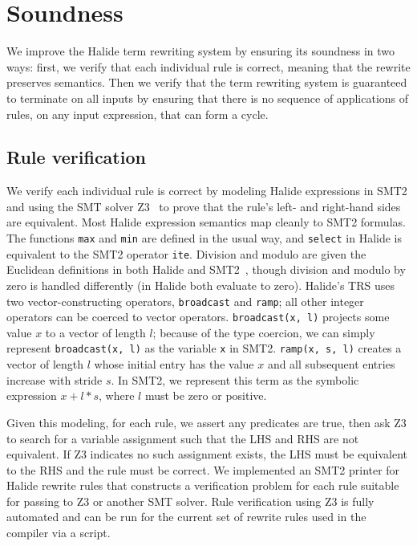 \documentclass[acmsmall,review]{acmart}\settopmatter{printfolios=true,printccs=false,printacmref=false}
\begin{document}
\section{Soundness}
\label{sec:soundness}

We improve the Halide term rewriting system by ensuring its soundness in
two ways: first, we verify that each individual rule is correct, meaning that the
rewrite preserves semantics. Then we verify that the term rewriting system is
guaranteed to terminate on all inputs by ensuring that there is no sequence of
applications of rules, on any input expression, that can form a cycle.

\subsection{Rule verification}

We verify each individual rule is correct by modeling Halide
expressions in SMT2 and using the SMT solver Z3~\cite{de2008z3} to
prove that the rule's left- and right-hand sides are equivalent. Most Halide expression
semantics map cleanly to SMT2 formulas. The functions \texttt{max} and
\texttt{min} are defined in the usual way, and \texttt{select} in
Halide is equivalent to the SMT2 operator \texttt{ite}. Division and
modulo are given the Euclidean definitions in both Halide and
SMT2~\cite{boute1992euclidean}, though division and modulo by zero is handled
differently (in Halide both evaluate to zero).
Halide's TRS uses two vector-constructing operators, \texttt{broadcast} and \texttt{ramp}; all
other integer operators can be coerced to vector operators. 
\texttt{broadcast(x, l)} projects some value $x$ to a vector of length $l$; because of
the type coercion, we can simply represent \texttt{broadcast(x, l)} as the variable
\texttt{x} in SMT2. \texttt{ramp(x, s, l)} creates a vector of length $l$
whose initial entry has the value $x$ and all subsequent entries increase with
stride $s$. In SMT2, we represent this term as the symbolic expression $x + l *
s$, where $l$ must be zero or positive.

Given this modeling, for each rule, we assert any predicates are true, then
ask Z3 to search for a variable assignment such that the LHS and RHS are not
equivalent.  If Z3 indicates no such assignment exists, the LHS must be equivalent to
the RHS and the rule must be correct. We implemented an SMT2 printer for 
Halide rewrite rules that constructs a verification problem for each rule
suitable for passing to Z3 or another SMT solver.  Rule verification using Z3 is fully automated
and can be run for the current set of rewrite rules used in the compiler via a script.
\end{document}
